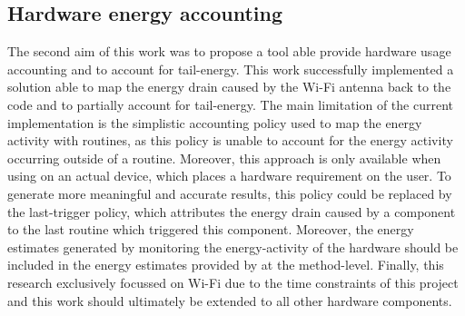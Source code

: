 \subsection{Hardware energy accounting}
The second aim of this work was to propose a tool able provide hardware usage accounting and to account for tail-energy.
This work successfully implemented a solution able to map the energy drain caused by the Wi-Fi antenna back to the code and to partially account for tail-energy.
The main limitation of the current implementation is the simplistic accounting policy used to map the energy activity with routines, as this policy is unable to account for the energy activity occurring outside of a routine.
Moreover, this approach is only available when using \orka{} on an actual device, which places a hardware requirement on the user.
To generate more meaningful and accurate results, this policy could be replaced by the last-trigger policy, which attributes the energy drain caused by a component to the last routine which triggered this component.
Moreover, the energy estimates generated by monitoring the energy-activity of the hardware should be included in the energy estimates provided by \orka{} at the method-level.
Finally, this research exclusively focussed on Wi-Fi due to the time constraints of this project and this work should ultimately be extended to all other hardware components.